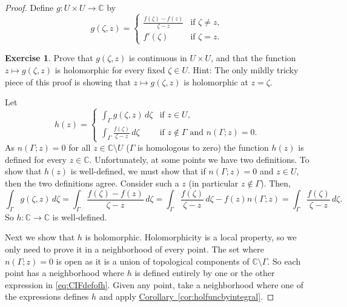 \documentclass[12pt,openany]{book}
\newcommand{\C}{{\mathbb{C}}}
\theoremstyle{plain}
\theoremstyle{remark}
\theoremstyle{definition}
\newenvironment{exbox}{%
    \def\FrameCommand{\vrule width 1pt \relax\hspace{10pt}}%
    \MakeFramed{\advance\hsize-\width\FrameRestore}%
}{%
    \endMakeFramed
}
\theoremstyle{exercise}
\newtheorem{exercise}{Exercise}[section]
\theoremstyle{example}
\newcommand{\corref}[1]{\hyperref[#1]{Corollary~\ref*{#1}}}
\begin{document}
\begin{proof}
Define $g \colon U \times U \to \C$ by
\begin{equation*}
g(\zeta,z) =
\begin{cases}
\frac{f(\zeta)-f(z)}{\zeta-z} & \text{if } \zeta \not= z , \\
f'(\zeta)                 & \text{if } \zeta = z .
\end{cases}
\end{equation*}

\begin{exbox}
\begin{exercise}
Prove that $g(\zeta,z)$ is continuous in $U \times U$, and that
the function $z \mapsto g(\zeta,z)$ is holomorphic for every fixed $\zeta \in U$.
Hint: The only mildly tricky piece of this proof is showing that $z \mapsto
g(\zeta,z)$ is
holomorphic at $z=\zeta$.
\end{exercise}
\end{exbox}

Let
\begin{equation}\label{eq:CIFdefofh}
h(z) = 
\begin{cases}
\int_\Gamma g(\zeta,z) \, d\zeta & \text{if } z \in U , \\
\int_\Gamma \frac{f(\zeta)}{\zeta-z} \, d\zeta & \text{if } z \not \in
\Gamma \text{ and } n(\Gamma;z) = 0 .
\end{cases}
\end{equation}
As $n(\Gamma;z) = 0$ for all $z \in \C \setminus U$
($\Gamma$ is homologous to zero)
the function $h(z)$ is defined for every $z \in \C$.
Unfortunately, at some points
we have two definitions.
To show that $h(z)$ is well-defined, we must show that if
$n(\Gamma;z) = 0$ and $z \in U$, then the two definitions agree.
Consider such a $z$ (in particular $z \notin \Gamma$).  Then,
\begin{equation*}
\int_\Gamma g(\zeta,z) \, d\zeta
=
\int_\Gamma \frac{f(\zeta)-f(z)}{\zeta-z} \, d\zeta
=
\int_\Gamma \frac{f(\zeta)}{\zeta-z} \, d\zeta
-
f(z) n(\Gamma;z)
=
\int_\Gamma \frac{f(\zeta)}{\zeta-z} \, d\zeta .
\end{equation*}
So $h \colon \C \to \C$ is well-defined.

Next we show that $h$ is
holomorphic.
Holomorphicity is a local property, so we only need to prove it 
in a neighborhood of every point.
The set where $n(\Gamma;z) = 0$ is open as it is a
union of topological components of $\C \setminus \Gamma$.
So each point has a neighborhood where $h$ is defined
entirely by one or the other expression in \eqref{eq:CIFdefofh}.
Given any point,
take a neighborhood where one of the expressions defines
$h$ and apply \corref{cor:holfuncbyintegral}.


\end{proof}
\end{document}
